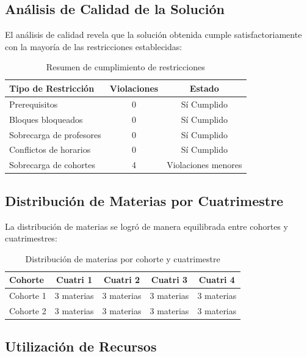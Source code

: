 \newpage
\subsection{Análisis de Calidad de la Solución}

El análisis de calidad revela que la solución obtenida cumple satisfactoriamente con la mayoría de las restricciones establecidas:

\begin{table}[htbp]
\centering
\begin{tabular}{|l|c|c|}
\hline
\textbf{Tipo de Restricción} & \textbf{Violaciones} & \textbf{Estado} \\
\hline
Prerequisitos & 0 & Sí Cumplido \\
Bloques bloqueados & 0 & Sí Cumplido \\
Sobrecarga de profesores & 0 & Sí Cumplido \\
Conflictos de horarios & 0 & Sí Cumplido \\
Sobrecarga de cohortes & 4 & Violaciones menores \\
\hline
\end{tabular}
\caption{Resumen de cumplimiento de restricciones}
\label{tab:restricciones}
\end{table}

\subsection{Distribución de Materias por Cuatrimestre}

La distribución de materias se logró de manera equilibrada entre cohortes y cuatrimestres:

\begin{table}[htbp]
\centering
\begin{tabular}{|l|c|c|c|c|}
\hline
\textbf{Cohorte} & \textbf{Cuatri 1} & \textbf{Cuatri 2} & \textbf{Cuatri 3} & \textbf{Cuatri 4} \\
\hline
Cohorte 1 & 3 materias & 3 materias & 3 materias & 3 materias \\
Cohorte 2 & 3 materias & 3 materias & 3 materias & 3 materias \\
\hline
\end{tabular}
\caption{Distribución de materias por cohorte y cuatrimestre}
\label{tab:distribucion_materias}
\end{table}

\subsection{Utilización de Recursos}

